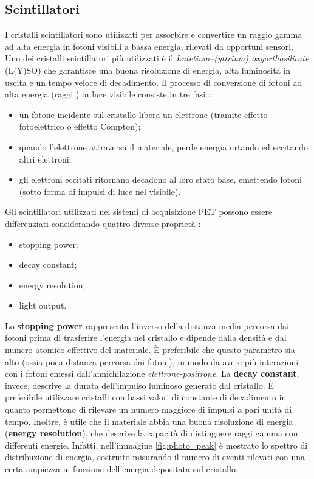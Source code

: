 \subsection{Scintillatori}
I cristalli scintillatori sono utilizzati per assorbire e convertire un raggio gamma ad alta energia in fotoni visibili a bassa energia, rilevati da opportuni sensori. Uno dei cristalli scintillatori più utilizzati è il \textit{Lutetium–(yttrium) oxyorthosilicate} (L(Y)SO) che garantisce una buona risoluzione di energia, alta luminosità in uscita e un tempo veloce di decadimento. Il processo di conversione di fotoni ad alta energia (raggi \textgamma) in luce visibile consiste in tre fasi \cite{RamseyDerek}:
\begin{itemize}
	\item un fotone incidente sul cristallo libera un elettrone (tramite effetto fotoelettrico o effetto Compton);
	\item quando l'elettrone attraversa il materiale, perde energia urtando ed eccitando altri elettroni;
	\item gli elettroni eccitati ritornano decadono al loro stato base, emettendo fotoni (sotto forma di impulsi di luce nel visibile).
\end{itemize}
Gli scintillatori utilizzati nei sistemi di acquisizione PET possono essere differenziati considerando quattro diverse proprietà \cite{Schmitz2013ThePO}:
\begin{itemize}
	\item stopping power;
	\item decay constant;
	\item energy resolution;
	\item light output.
\end{itemize}
Lo \textbf{stopping power} rappresenta l'inverso della distanza media percorsa dai fotoni prima di trasferire l'energia nel cristallo e dipende dalla densità e dal numero atomico effettivo del materiale. \`E preferibile che questo parametro sia alto (ossia poca distanza percorsa dai fotoni), in modo da avere più interazioni con i fotoni emessi dall'annichilazione \textit{elettrone-positrone}. La \textbf{decay constant}, invece, descrive la durata dell'impulso luminoso generato dal cristallo. \`E preferibile utilizzare cristalli con bassi valori di constante di decadimento in quanto permettono di rilevare un numero maggiore di impulsi a pari unità di tempo. Inoltre, è utile che il materiale abbia una buona risoluzione di energia (\textbf{energy resolution}), che descrive la capacità di distinguere raggi gamma con differenti energie. Infatti, nell'immagine \ref{fig:photo_peak} è mostrato lo spettro di distribuzione di energia, costruito misurando il numero di eventi rilevati con una certa ampiezza in funzione dell'energia depositata sul cristallo.
